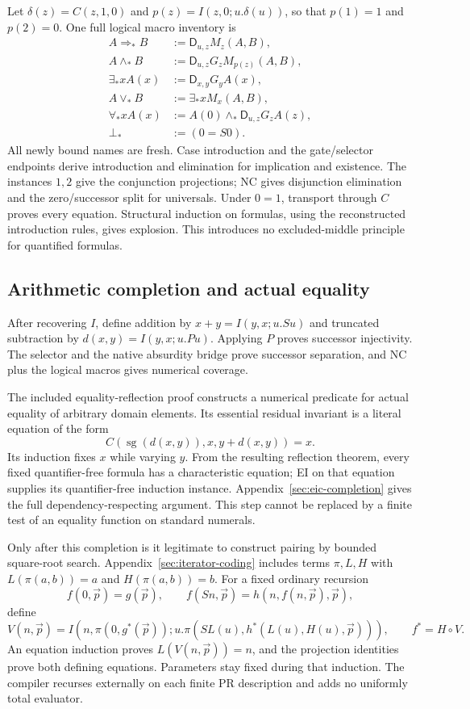 \documentclass[11pt,letterpaper]{article}
\theoremstyle{definition}\newtheorem{definition}[theorem]{Definition}
\theoremstyle{remark}\newtheorem{remark}[theorem]{Remark}
\newcommand{\D}{\mathsf D}
\begin{document}
Let $\delta(z)=C(z,1,0)$ and $p(z)=I(z,0;u.\delta(u))$, so that
$p(1)=1$ and $p(2)=0$. One full logical macro inventory is
\[
\begin{aligned}
 A\Rightarrow_*B&:=\D_{u,z}M_z(A,B),\\
 A\wedge_*B&:=\D_{u,z}G_zM_{p(z)}(A,B),\\
 \exists_*xA(x)&:=\D_{x,y}G_yA(x),\\
 A\vee_*B&:=\exists_*xM_x(A,B),\\
 \forall_*xA(x)&:=A(0)\wedge_*\D_{u,z}G_zA(z),\\
 \bot_*&:=(0=S0).
\end{aligned}
\]
All newly bound names are fresh. Case introduction and the gate/selector
endpoints derive introduction and elimination for implication and
existence. The instances $1,2$ give the conjunction projections; NC gives
disjunction elimination and the zero/successor split for universals.
Under $0=1$, transport through $C$ proves every equation. Structural
induction on formulas, using the reconstructed introduction rules, gives
explosion. This introduces no excluded-middle principle for quantified
formulas.

\subsection{Arithmetic completion and actual equality}

After recovering $I$, define addition by $x+y=I(y,x;u.Su)$ and truncated
subtraction by $d(x,y)=I(y,x;u.Pu)$. Applying $P$ proves successor
injectivity. The selector and the native absurdity bridge prove successor
separation, and NC plus the logical macros gives numerical coverage.

The included equality-reflection proof constructs a numerical predicate
for actual equality of arbitrary domain elements. Its essential residual
invariant is a literal equation of the form
\[
 C(\operatorname{sg}(d(x,y)),x,y+d(x,y))=x.
\]
Its induction fixes $x$ while varying $y$. From the resulting reflection
theorem, every fixed quantifier-free formula has a characteristic equation;
EI on that equation supplies its quantifier-free induction instance.
Appendix~\ref{sec:eic-completion} gives the full dependency-respecting
argument. This step cannot be replaced by a finite test of an equality
function on standard numerals.

Only after this completion is it legitimate to construct pairing by
bounded square-root search. Appendix~\ref{sec:iterator-coding} includes
terms $\pi,L,H$ with $L(\pi(a,b))=a$ and $H(\pi(a,b))=b$.
For a fixed ordinary recursion
\[
 f(0,\vec p)=g(\vec p),\qquad
 f(Sn,\vec p)=h(n,f(n,\vec p),\vec p),
\]
define
\[
 V(n,\vec p)=I(n,\pi(0,g^*(\vec p));
 u.\pi(SL(u),h^*(L(u),H(u),\vec p))),\qquad f^*=H\circ V.
\]
An equation induction proves $L(V(n,\vec p))=n$, and the projection
identities prove both defining equations. Parameters stay fixed during
that induction. The compiler recurses externally on each finite PR
description and adds no uniformly total evaluator.
\end{document}
